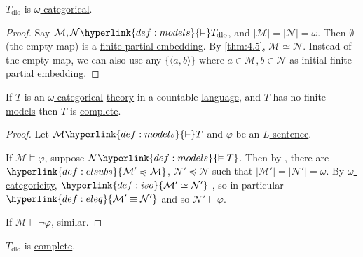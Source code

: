 \documentclass{article}
\let\models\vDash
\begin{document}
\begin{ncor}\label{cor:4.7}
  \hyperlink{def:tlo}{$T_{\text{dlo}}$} is \hyperlink{def:wcat}{$\omega$-categorical}.
\end{ncor}
\begin{proof}
  Say $\mathcal{M},\mathcal{N} \hyperlink{def:models}{\models} T_{\text{dlo}}$, and $|\mathcal{M}| = |\mathcal{N}| = \omega$.
  Then $\emptyset$ (the empty map) is a \hyperlink{def:pe}{finite partial embedding}.
  By \cref{thm:4.5}, $\mathcal{M} \simeq \mathcal{N}$.
  Instead of the empty map, we can also use any $\{\langle a, b \rangle\}$ where $a \in \mathcal{M}, b \in \mathcal{N}$ as initial finite partial embedding.
\end{proof}
\begin{nthm}\label{thm:4.8}
  If $T$ is an \hyperlink{def:wcat}{$\omega$-categorical} \hyperlink{def:ltheory}{theory} in a countable \hyperlink{def:lang}{language}, and $T$ has no finite \hyperlink{def:model}{models} then $T$ is \hyperlink{def:complete}{complete}.
\end{nthm}
\begin{proof}
  Let $\mathcal{M} \hyperlink{def:models}{\models} T$ and $\varphi$ be an \hyperlink{def:sentence}{$L$-sentence}.

  If $\mathcal{M} \models \varphi$, suppose $\mathcal{N} \hyperlink{def:models}{\models T}$.
  Then by , there are $\hyperlink{def:elsubs}{\mathcal{M}' \preccurlyeq \mathcal{M}}$, $\mathcal{N}' \preccurlyeq \mathcal{N}$ such that $|\mathcal{M}'| = |\mathcal{N}'| = \omega$.
  By \hyperlink{def:wcat}{$\omega$-categoricity}, $\hyperlink{def:iso}{\mathcal{M}' \simeq \mathcal{N}'}$ , so in particular $\hyperlink{def:eleq}{\mathcal{M}' \equiv \mathcal{N}'}$ and so $\mathcal{N}' \models \varphi$.

  If $\mathcal{M} \models \lnot \varphi$, similar.
\end{proof}
\begin{ncor}\label{cor:4.9}
  \hyperlink{def:tlo}{$T_{\text{dlo}}$} is \hyperlink{def:complete}{complete}.
\end{ncor}
\end{document}
